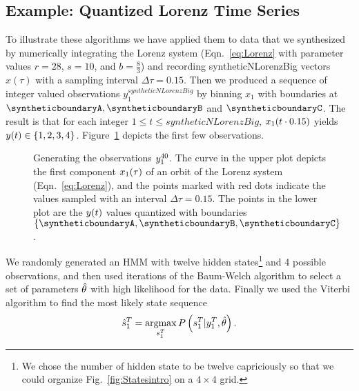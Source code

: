 \subsection{Example: Quantized Lorenz Time Series}
\label{sec:QuantizedLorenz}


To illustrate these algorithms we have applied them to data that we
synthesized by numerically integrating the Lorenz system
(Eqn.~\eqref{eq:Lorenz} with parameter values $r=28$, $s=10$, and
$b=\frac{8}{3}$) and recording syntheticNLorenzBig vectors $x(\tau)$ with a
sampling interval $\Delta \tau = 0.15$.  Then we produced a sequence
of integer valued observations $y_1^{syntheticNLorenzBig}$ by binning $x_1$
with boundaries at $\syntheticboundaryA,\syntheticboundaryB$ and $\syntheticboundaryC$.  The
result is that for each integer $1\leq t \leq syntheticNLorenzBig$,
${x_1}{(t\cdot0.15)}$ yields ${y}{(t)} \in \left\{1,2,3,4\right\}$.
Figure~\ref{fig:TSintro} depicts the first few observations.

\begin{figure}[htbp]
  \caption[Generating the observations
  $\ts{y}{1}{40}$.]%
  {Generating the observations $\ts{y}{1}{40}$.  The curve in the
    upper plot depicts the first component ${x_1}{(\tau)}$ of an
    orbit of the Lorenz system (Eqn.~\ref{eq:Lorenz}), and the points
    marked with red dots indicate the values sampled with an interval
    $\Delta \tau = 0.15$.  The points in the lower plot are the
    ${y}{(t)}$ values quantized with boundaries
    $\left\{\syntheticboundaryA, \syntheticboundaryB, \syntheticboundaryC\right\}$.  }
  \label{fig:TSintro} 
\end{figure}
 
We randomly generated an HMM with twelve hidden states\footnote{We
  chose the number of hidden state to be twelve capriciously so that
  we could organize Fig.~\ref{fig:Statesintro} on a $4\times 4$ grid.}
and 4 possible observations, and then used \syntheticLorenzTrainingIterations
iterations of the Baum-Welch algorithm to select a set of parameters
$\hat {\theta}$ with high likelihood for the data.  Finally we used
the Viterbi algorithm to find the most likely state sequence
 \begin{equation*}
   {\hat s_{1}^{T}} = \operatorname*{argmax}_{s_{1}^{T}}P
   \left(s_{1}^{T}|y_{1}^{T}, \hat {\theta} \right).
 \end{equation*}
 
